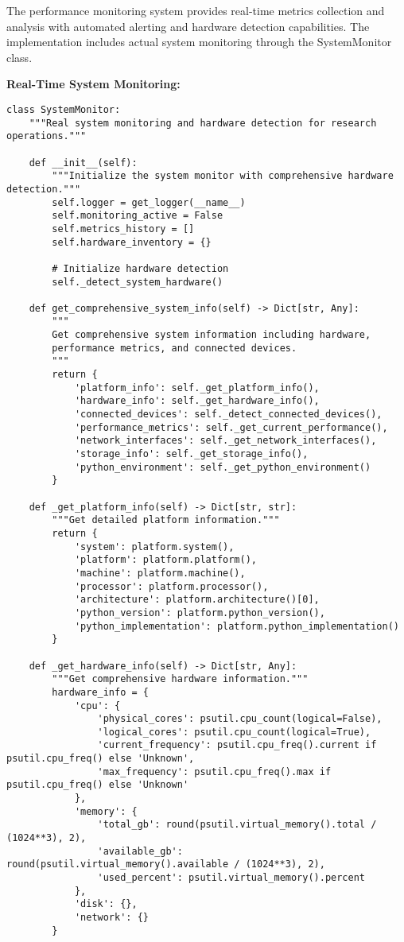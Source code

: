 \documentclass[11pt,a4paper]{article}
\begin{document}
The performance monitoring system provides real-time metrics collection and analysis with automated alerting and
hardware detection capabilities. The implementation includes actual system monitoring through the SystemMonitor class.

\textbf{Real-Time System Monitoring:}

\begin{verbatim}
class SystemMonitor:
    """Real system monitoring and hardware detection for research operations."""

    def __init__(self):
        """Initialize the system monitor with comprehensive hardware detection."""
        self.logger = get_logger(__name__)
        self.monitoring_active = False
        self.metrics_history = []
        self.hardware_inventory = {}

        # Initialize hardware detection
        self._detect_system_hardware()

    def get_comprehensive_system_info(self) -> Dict[str, Any]:
        """
        Get comprehensive system information including hardware,
        performance metrics, and connected devices.
        """
        return {
            'platform_info': self._get_platform_info(),
            'hardware_info': self._get_hardware_info(),
            'connected_devices': self._detect_connected_devices(),
            'performance_metrics': self._get_current_performance(),
            'network_interfaces': self._get_network_interfaces(),
            'storage_info': self._get_storage_info(),
            'python_environment': self._get_python_environment()
        }

    def _get_platform_info(self) -> Dict[str, str]:
        """Get detailed platform information."""
        return {
            'system': platform.system(),
            'platform': platform.platform(),
            'machine': platform.machine(),
            'processor': platform.processor(),
            'architecture': platform.architecture()[0],
            'python_version': platform.python_version(),
            'python_implementation': platform.python_implementation()
        }

    def _get_hardware_info(self) -> Dict[str, Any]:
        """Get comprehensive hardware information."""
        hardware_info = {
            'cpu': {
                'physical_cores': psutil.cpu_count(logical=False),
                'logical_cores': psutil.cpu_count(logical=True),
                'current_frequency': psutil.cpu_freq().current if psutil.cpu_freq() else 'Unknown',
                'max_frequency': psutil.cpu_freq().max if psutil.cpu_freq() else 'Unknown'
            },
            'memory': {
                'total_gb': round(psutil.virtual_memory().total / (1024**3), 2),
                'available_gb': round(psutil.virtual_memory().available / (1024**3), 2),
                'used_percent': psutil.virtual_memory().percent
            },
            'disk': {},
            'network': {}
        }


\end{verbatim}
\end{document}
